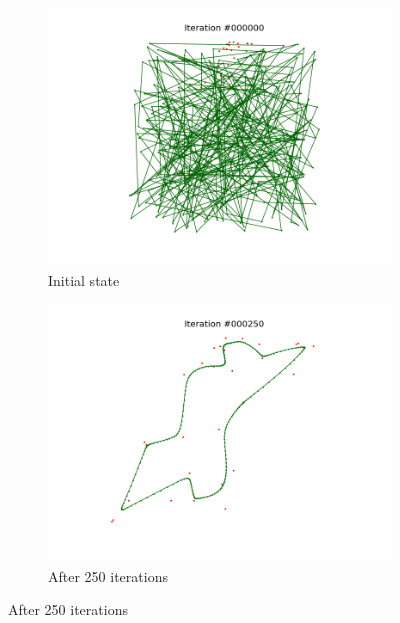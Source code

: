 \documentclass[11pt]{article}
\begin{document}
\begin{figure}
\centering
\begin{subfigure}{.33\textwidth}
  \centering
  \includegraphics[trim={4cm 2cm 4cm 2cm}, clip=true,
  width=\linewidth]{w_0.png}
  \caption{Initial state}
  
\end{subfigure}%
\begin{subfigure}{.33\textwidth}
  \centering
  \includegraphics[trim={4cm 2cm 4cm 2cm}, clip=true,width=\linewidth]{w_250.png}
  \caption{After 250 iterations}
  

\end{subfigure}
\end{figure}
\end{document}
